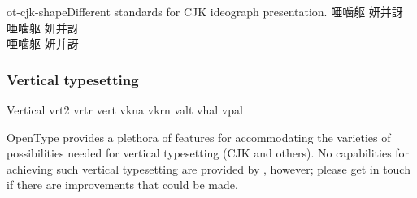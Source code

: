 \documentclass[a4paper]{l3doc}
\begin{document}
\begin{Xexample}[firstline=2]{ot-cjk-shape}{Different standards for CJK ideograph presentation.}
  \LARGE\def\text{ 唖噛躯 妍并訝}
  {
  \text }                          \\
  {
  \text }                          \\
  {
  \text }
\end{Xexample}


\subsubsection{Vertical typesetting}

\begin{features}{Vertical}
         {vrt2}
 {vrtr}
            {vert}
        {vkna}
               {vkrn}
      {valt}
           {vhal}
   {vpal}
\end{features}

OpenType provides a plethora of features for accommodating the varieties of possibilities
needed for vertical typesetting (CJK and others).
No capabilities for achieving such vertical typesetting are provided by ,
however; please get in touch if there are improvements that could be made.
\end{document}
